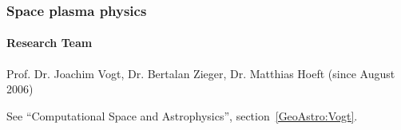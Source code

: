 
\subsubsection{Space plasma physics}

\paragraph{Research Team}
Prof. Dr. Joachim Vogt, Dr. Bertalan Zieger, Dr. Matthias Hoeft
(since August 2006)

\vspace{1em}

See ``Computational Space and Astrophysics'',
section~\ref{GeoAstro:Vogt}.

